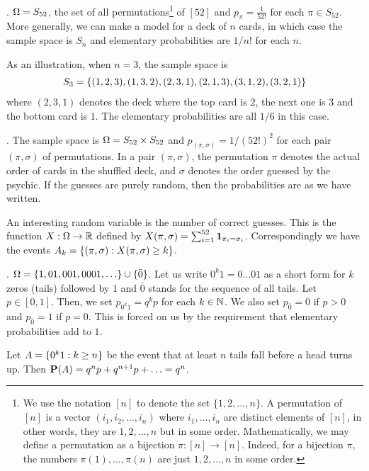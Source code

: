 \documentclass[preprint,  11pt]{amsart}
\def\sig{{\sigma}}
\begin{document}
\begin{example} . $\Ome=S_{52}$, the set of all permutations\footnote{We use the notation $[n]$ to denote the set $\{1,2,\ldots ,n\}$. A permutation of $[n]$ is a vector $(i_{1},i_{2},\ldots ,i_{n})$ where $i_{1},\ldots ,i_{n}$ are distinct elements of $[n]$, in other words, they are $1,2,\ldots ,n$ but in some order. Mathematically, we may define a permutation as a bijection $\pi:[n]\to [n]$. Indeed, for a bijection $\pi$, the numbers $\pi(1),\ldots ,\pi(n)$ are just $1,2,\ldots ,n$ in some order.} of $[52]$ and $p_{\pi}=\frac{1}{52!}$ for each $\pi\in S_{52}$. More generally, we can make a model for a deck of $n$ cards, in which case the sample space is $S_n$ and elementary probabilities are $1/n!$ for each $n$.

As an illustration, when $n=3$, the sample space is
\begin{align*}
S_3=\l\{(1,2,3), (1,3,2), (2,3,1), (2,1,3), (3,1,2), (3,2,1) \r\}
\end{align*}
where $(2,3,1)$ denotes the deck where the top card is $2$, the next one is $3$ and the bottom card is $1$. The elementary probabilities are all $1/6$ in this case.
\end{example}

\beg {}. The sample space is $\Ome=S_{52}\times S_{52}$ and $p_{(\pi,\sig)}=1/(52!)^{2}$ for each pair $(\pi,\sig)$ of permutations. In a pair $(\pi,\sig)$, the permutation $\pi$ denotes the actual order of  cards in the shuffled deck, and $\sig$ denotes the order guessed by the psychic. If the guesses are purely random, then the probabilities are as we have written.

An interesting random variable is the number of correct guesses. This is the function $X:\Ome\to \R$ defined by $X(\pi,\sig)=\sum_{i=1}^{52}\one_{\pi_{i}=\sig_{i}}$. Correspondingly we have the events $A_{k}=\{(\pi,\sig)\suchthat X(\pi,\sig)\ge k\}$. 
\eeg

\begin{example} . $\Ome=\{1,01,001,0001,\ldots \}\cup\{\bar{0}\}$. Let us write $0^{k}1=0\ldots01$ as a short form for $k$ zeros (tails) followed by $1$ and $\bar{0}$ stands for the sequence of all tails. Let $p\in [0,1]$. Then, we set $p_{0^{k}1}=q^{k}p$ for each $k\in \N$. We also set $p_{\bar{0}}=0$ if $p>0$ and $p_{\bar{0}}=1$ if $p=0$. This is forced on us by the requirement that elementary probabilities add to $1$.

Let $A=\{0^{k}1\suchthat k\ge n\}$ be the event that at least $n$ tails fall before a head turns up. Then $\P(A)=q^{n}p+q^{n+1}p+\ldots =q^{n}$.
\end{example}
\end{document}

